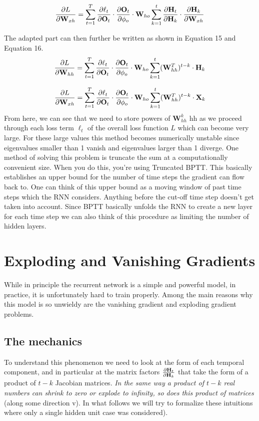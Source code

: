 \documentclass{article}
\begin{document}
\begin{equation}
  \pdv{L}{\mathbf{W}_{xh}} = \sum_{t=1}^T \pdv{\ell_t}{\mathbf{O}_t} \cdot \pdv{\mathbf{O}_t}{\phi_o} \cdot \mathbf{W}_{ho} \sum_{k=1}^t \pdv{\mathbf{H}_t}{\mathbf{H}_k} \cdot \pdv{\mathbf{H}_k}{\mathbf{W}_{xh}}
\end{equation}

The adapted part can then further be written as shown in Equation 15 and Equation 16.
\begin{equation}
  \pdv{L}{\mathbf{W}_{hh}} = \sum_{t=1}^T \pdv{\ell_t}{\mathbf{O}_t} \cdot \pdv{\mathbf{O}_t}{\phi_o} \cdot \mathbf{W}_{ho} \sum_{k=1}^t (\mathbf{W}_{hh}^T)^{t-k} \cdot \mathbf{H}_k
\end{equation}

\begin{equation}
  \pdv{L}{\mathbf{W}_{xh}} = \sum_{t=1}^T \pdv{\ell_t}{\mathbf{O}_t} \cdot \pdv{\mathbf{O}_t}{\phi_o} \cdot \mathbf{W}_{ho} \sum_{k=1}^t (\mathbf{W}_{hh}^T)^{t-k} \cdot \mathbf{X}_k
\end{equation}
From here, we can see that we need to store powers of $\mathbf{W}_{hh}^k$
hh as we proceed through each loss term $\ell_t$
of the overall loss function $L$ which can become very large. For these large values this method
becomes numerically unstable since eigenvalues smaller than 1 vanish and eigenvalues larger than 1
diverge. One method of solving this problem is truncate the sum at a computationally convenient
size. When you do this, you're using Truncated BPTT. This basically establishes an upper
bound for the number of time steps the gradient can flow back to. One can think of this upper
bound as a moving window of past time steps which the RNN considers. Anything before the cut-off
time step doesn't get taken into account. Since BPTT basically unfolds the RNN to create a new layer
for each time step we can also think of this procedure as limiting the number of hidden layers.

\section{Exploding and Vanishing Gradients}
While in principle the recurrent network is a simple
and powerful model, in practice, it is unfortunately
hard to train properly. Among the main reasons why
this model is so unwieldy are the vanishing gradient and exploding gradient problems.
\subsection{The mechanics}
To understand this phenomenon we need to look at the
form of each temporal component, and in particular at
the matrix factors $\pdv{\mathbf{H}_t}{\mathbf{H}_k}$ that take the
form of a product of $t-k$ Jacobian matrices. \textit{In the
same way a product of $t-k$ real numbers can shrink
to zero or explode to infinity, so does this product of
matrices} (along some direction v).
In what follows we will try to formalize these intuitions where only a single hidden unit case was
considered).
\end{document}
